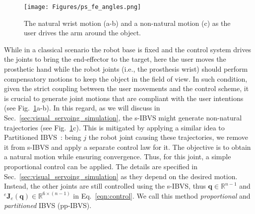 \begin{figure}
    \centering
    \vspace{+0.30cm}
    \texttt{[image: Figures/ps\_fe\_angles.png]}
    \caption{The natural wrist motion (a-b) and a non-natural motion (c) as the user drives the arm around the object.}
    \vspace{-0.60cm}
    \label{fig:ps_fe_angles}
\end{figure}

 While in a classical scenario the robot base is fixed and the control system drives the joints to bring the end-effector to the target, 
here the user moves the prosthetic hand while the robot joints (i.e., the prosthesis wrist) should perform compensatory motions to keep the object in the field of view. In such condition, given the strict coupling between the user movements and the control scheme, it is crucial to generate joint motions that are compliant with the user intentions (see Fig.~\ref{fig:ps_fe_angles}a-b). 
In this regard, as we will discuss in Sec.~\ref{sec:visual_servoing_simulation}, the s-IBVS might generate non-natural trajectories (see Fig.~\ref{fig:ps_fe_angles}c). This is mitigated by applying a similar idea to Partitioned IBVS~\cite{corke2023}: being $j$ the robot joint causing these trajectories, we remove it from s-IBVS and apply a separate control law for it. The objective is to obtain a natural motion while ensuring convergence. Thus, for this joint, a simple proportional control can be applied. The details are specified in Sec.~\ref{sec:visual_servoing_simulation} as they depend on the desired motion. Instead, the other joints are still controlled using the s-IBVS, thus $\mathbf{q} \in \mathbb{R}^{n-1}$ and $^e\mathbf{J}_e(\mathbf{q}) \in \mathbb{R}^{6\times {(n-1)}}$ in Eq.~\eqref{eqn:control}. We call this method \textit{proportional} and \textit{partitioned} IBVS (pp-IBVS).

